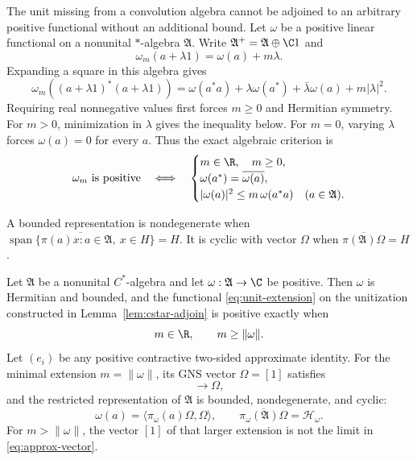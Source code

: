 The unit missing from a convolution algebra cannot be adjoined to an
arbitrary positive functional without an additional bound.  Let $\omega$
be a positive linear functional on a nonunital $*$-algebra $\mathfrak A$.
Write
$\mathfrak A^+=\mathfrak A\oplus\C1$ and
\begin{equation}
 \omega_m(a+\lambda1)=\omega(a)+m\lambda.
 \label{eq:unit-extension}
\end{equation}
Expanding a square in this algebra gives
\[
 \omega_m((a+\lambda1)^*(a+\lambda1))
 =\omega(a^*a)+\lambda\omega(a^*)+\bar\lambda\omega(a)+m|\lambda|^2.
\]
Requiring real nonnegative values first forces $m\geq0$ and Hermitian
symmetry.  For $m>0$, minimization in $\lambda$ gives the inequality below.
For $m=0$, varying $\lambda$ forces $\omega(a)=0$ for every $a$.
Thus the exact algebraic criterion is
\begin{equation}
 \omega_m\text{ is positive}
 \quad\Longleftrightarrow\quad
 \begin{cases}
 m\in\R,\quad m\geq0,\\
 \omega(a^*)=\overline{\omega(a)},\\
 |\omega(a)|^2\leq m\,\omega(a^*a)&(a\in\mathfrak A).
 \end{cases}
 \label{eq:unit-criterion}
\end{equation}

A bounded representation is nondegenerate when
$\overline{\operatorname{span}\{\pi(a)x:a\in\mathfrak A,\ x\in H\}}=H$.
It is cyclic with vector $\Omega$ when
$\overline{\pi(\mathfrak A)\Omega}=H$.

\begin{theorem}
Let\label{thm:cstar-unitization} $\mathfrak A$ be a nonunital $C^*$-algebra and let
$\omega:\mathfrak A\to\C$ be positive.  Then $\omega$ is Hermitian and
bounded, and the functional \eqref{eq:unit-extension} on the unitization
constructed in Lemma~\ref{lem:cstar-adjoin} is positive exactly when
\begin{equation}
 m\in\R,\qquad m\geq\|\omega\|.
 \label{eq:minimal-mass}
\end{equation}
Let $(e_i)$ be any positive contractive two-sided approximate identity.
For the minimal extension $m=\|\omega\|$, its GNS vector
$\Omega=[1]$ satisfies
\begin{equation}
 [e_i]\longrightarrow\Omega,
 \label{eq:approx-vector}
\end{equation}
and the restricted representation of $\mathfrak A$ is bounded,
nondegenerate, and cyclic:
\begin{equation}
 \omega(a)=\langle\pi_\omega(a)\Omega,\Omega\rangle,
 \qquad
 \overline{\pi_\omega(\mathfrak A)\Omega}=\mathcal H_\omega.
 \label{eq:cyclic-vector}
\end{equation}
For $m>\|\omega\|$, the vector $[1]$ of that larger extension is not the
limit in \eqref{eq:approx-vector}.
\end{theorem}

